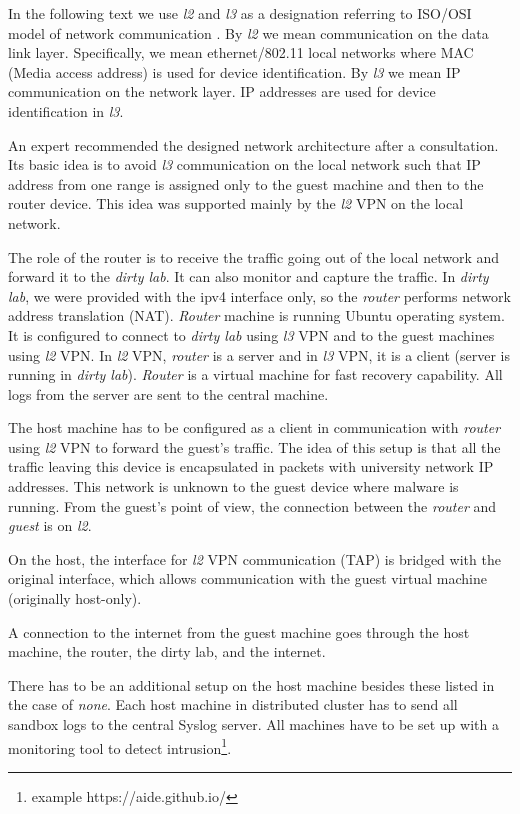 In the following text we use \emph{l2} and \emph{l3} as a designation referring to ISO/OSI model of network communication \cite{Zimmermann1980}. By \emph{l2} we mean communication on the data link layer. Specifically, we mean ethernet/802.11 local networks where MAC (Media access address) is used for device identification. By \emph{l3} we mean IP communication on the network layer. IP addresses are used for device identification in \emph{l3}.

An expert recommended the designed network architecture after a consultation. Its basic idea is to avoid \emph{l3} communication on the local network such that IP address from one range is assigned only to the guest machine and then to the router device. This idea was supported mainly by the \emph{l2} VPN on the local network.

The role of the router is to receive the traffic going out of the local network and forward it to the \emph{dirty lab}. It can also monitor and capture the traffic. In \emph{dirty lab}, we were provided with the ipv4 interface only, so the \emph{router} performs network address translation (NAT). \emph{Router} machine is running Ubuntu operating system. It is configured to connect to \emph{dirty lab} using \emph{l3} VPN and to the guest machines using \emph{l2} VPN. In \emph{l2} VPN, \emph{router} is a server and in \emph{l3} VPN, it is a client (server is running in \emph{dirty lab}). \emph{Router} is a virtual machine for fast recovery capability. All logs from the server are sent to the central machine.

The host machine has to be configured as a client in communication with \emph{router} using \emph{l2} VPN to forward the guest's traffic. The idea of this setup is that all the traffic leaving this device is encapsulated in packets with university network IP addresses. This network is unknown to the guest device where malware is running. From the guest's point of view, the connection between the \emph{router} and \emph{guest} is on \emph{l2}. 

On the host, the interface for \emph{l2} VPN communication (TAP) is bridged with the original interface, which allows communication with the guest virtual machine (originally host-only). 

A connection to the internet from the guest machine goes through the host machine, the router, the dirty lab, and the internet. 

There has to be an additional setup on the host machine besides these listed in the case of \emph{none}. Each host machine in distributed cluster has to send all sandbox logs to the central Syslog server. All machines have to be set up with a monitoring tool to detect intrusion\footnote{example https://aide.github.io/}.

